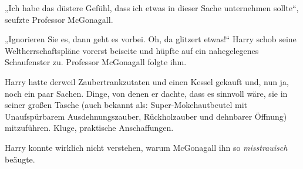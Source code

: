 „Ich habe das düstere Gefühl, dass ich etwas in dieser Sache unternehmen sollte“, seufzte Professor McGonagall.

„Ignorieren Sie es, dann geht es vorbei. Oh, da glitzert etwas!“ Harry schob seine Weltherrschaftspläne vorerst beiseite und hüpfte auf ein nahegelegenes Schaufenster zu. Professor McGonagall folgte ihm.

\later

Harry hatte derweil Zaubertrankzutaten und einen Kessel gekauft und, nun ja, noch ein paar Sachen. Dinge, von denen er dachte, dass es sinnvoll wäre, sie in seiner großen Tasche (auch bekannt als: Super-Mokehautbeutel  mit Unaufspürbarem Ausdehnungszauber, Rückholzauber und dehnbarer Öffnung) mitzuführen. Kluge, praktische Anschaffungen.

Harry konnte wirklich nicht verstehen, warum McGonagall ihn so \emph{misstrauisch} beäugte.

